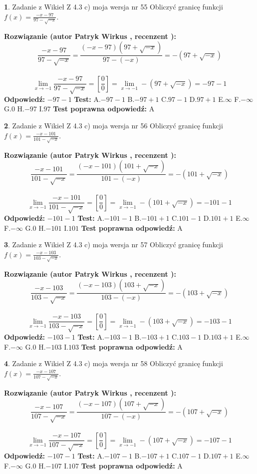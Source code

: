 \documentclass[12pt, a4paper]{article}
\theoremstyle{definition} %
\newtheorem{zad}{}
\newcommand{\zadStart}[1]{\begin{zad}#1\newline}
\newcommand{\zadStop}{\end{zad}}
\newcommand{\rozwStart}[2]{\noindent \textbf{Rozwiązanie (autor #1 , recenzent #2): }\newline}
\newcommand{\rozwStop}{\newline}
\newcommand{\odpStart}{\noindent \textbf{Odpowiedź:}\newline}
\newcommand{\odpStop}{\newline}
\newcommand{\testStart}{\noindent \textbf{Test:}\newline}
\newcommand{\testStop}{\newline}
\newcommand{\kluczStart}{\noindent \textbf{Test poprawna odpowiedź:}\newline}
\newcommand{\kluczStop}{\newline}
\begin{document}
\zadStart{Zadanie z Wikieł Z 4.3 c) moja wersja nr 55}
Obliczyć granicę funkcji $f(x)=\frac{-x-97}{97-\sqrt{-x}}$.
\zadStop
\rozwStart{Patryk Wirkus}{}
$$\frac{-x-97}{97-\sqrt{-x}}=\frac{(-x-97)(97+\sqrt{-x})}{97-(-x)}=-(97+\sqrt{-x})$$
\\
$$\lim\limits_{x\to-1}\frac{-x-97}{97-\sqrt{-x}}=[\frac{0}{0}]=\lim\limits_{x\to-1}-(97+\sqrt{-x}) =-97-1$$
\rozwStop
\odpStart
$-97-1$
\odpStop
\testStart
A.$-97-1$
B.$-97+1$
C.$97-1$
D.$97+1$
E.$\infty$
F.$-\infty$
G.$0$
H.$-97$
I.$97$
\testStop
\kluczStart
A
\kluczStop



\zadStart{Zadanie z Wikieł Z 4.3 c) moja wersja nr 56}
Obliczyć granicę funkcji $f(x)=\frac{-x-101}{101-\sqrt{-x}}$.
\zadStop
\rozwStart{Patryk Wirkus}{}
$$\frac{-x-101}{101-\sqrt{-x}}=\frac{(-x-101)(101+\sqrt{-x})}{101-(-x)}=-(101+\sqrt{-x})$$
\\
$$\lim\limits_{x\to-1}\frac{-x-101}{101-\sqrt{-x}}=[\frac{0}{0}]=\lim\limits_{x\to-1}-(101+\sqrt{-x}) =-101-1$$
\rozwStop
\odpStart
$-101-1$
\odpStop
\testStart
A.$-101-1$
B.$-101+1$
C.$101-1$
D.$101+1$
E.$\infty$
F.$-\infty$
G.$0$
H.$-101$
I.$101$
\testStop
\kluczStart
A
\kluczStop



\zadStart{Zadanie z Wikieł Z 4.3 c) moja wersja nr 57}
Obliczyć granicę funkcji $f(x)=\frac{-x-103}{103-\sqrt{-x}}$.
\zadStop
\rozwStart{Patryk Wirkus}{}
$$\frac{-x-103}{103-\sqrt{-x}}=\frac{(-x-103)(103+\sqrt{-x})}{103-(-x)}=-(103+\sqrt{-x})$$
\\
$$\lim\limits_{x\to-1}\frac{-x-103}{103-\sqrt{-x}}=[\frac{0}{0}]=\lim\limits_{x\to-1}-(103+\sqrt{-x}) =-103-1$$
\rozwStop
\odpStart
$-103-1$
\odpStop
\testStart
A.$-103-1$
B.$-103+1$
C.$103-1$
D.$103+1$
E.$\infty$
F.$-\infty$
G.$0$
H.$-103$
I.$103$
\testStop
\kluczStart
A
\kluczStop



\zadStart{Zadanie z Wikieł Z 4.3 c) moja wersja nr 58}
Obliczyć granicę funkcji $f(x)=\frac{-x-107}{107-\sqrt{-x}}$.
\zadStop
\rozwStart{Patryk Wirkus}{}
$$\frac{-x-107}{107-\sqrt{-x}}=\frac{(-x-107)(107+\sqrt{-x})}{107-(-x)}=-(107+\sqrt{-x})$$
\\
$$\lim\limits_{x\to-1}\frac{-x-107}{107-\sqrt{-x}}=[\frac{0}{0}]=\lim\limits_{x\to-1}-(107+\sqrt{-x}) =-107-1$$
\rozwStop
\odpStart
$-107-1$
\odpStop
\testStart
A.$-107-1$
B.$-107+1$
C.$107-1$
D.$107+1$
E.$\infty$
F.$-\infty$
G.$0$
H.$-107$
I.$107$
\testStop
\kluczStart
A
\kluczStop
\end{document}
